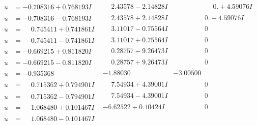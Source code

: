 \documentclass[1p]{elsarticle_modified}
\theoremstyle{definition}
\begin{document}
$$\begin{array}{c|c|c}
\begin{aligned}
u &= -0.708316 + 0.768193 I\end{aligned}
 & \phantom{-}2.43578 - 2.14828 I & \phantom{-0.000000 -}0. + 4.59076 I \\ \hline\begin{aligned}
u &= -0.708316 - 0.768193 I\end{aligned}
 & \phantom{-}2.43578 + 2.14828 I & \phantom{-0.000000 } 0. - 4.59076 I \\ \hline\begin{aligned}
u &= \phantom{-}0.745411 + 0.741861 I\end{aligned}
 & \phantom{-}3.11017 - 0.75564 I & \phantom{-0.000000 } 0 \\ \hline\begin{aligned}
u &= \phantom{-}0.745411 - 0.741861 I\end{aligned}
 & \phantom{-}3.11017 + 0.75564 I & \phantom{-0.000000 } 0 \\ \hline\begin{aligned}
u &= -0.669215 + 0.811820 I\end{aligned}
 & \phantom{-}0.28757 - 9.26473 I & \phantom{-0.000000 } 0 \\ \hline\begin{aligned}
u &= -0.669215 - 0.811820 I\end{aligned}
 & \phantom{-}0.28757 + 9.26473 I & \phantom{-0.000000 } 0 \\ \hline\begin{aligned}
u &= -0.935368\phantom{ +0.000000I}\end{aligned}
 & -1.88030\phantom{ +0.000000I} & -3.00500\phantom{ +0.000000I} \\ \hline\begin{aligned}
u &= \phantom{-}0.715362 + 0.794901 I\end{aligned}
 & \phantom{-}7.54934 + 4.39001 I & \phantom{-0.000000 } 0 \\ \hline\begin{aligned}
u &= \phantom{-}0.715362 - 0.794901 I\end{aligned}
 & \phantom{-}7.54934 - 4.39001 I & \phantom{-0.000000 } 0 \\ \hline\begin{aligned}
u &= \phantom{-}1.068480 + 0.101467 I\end{aligned}
 & -6.62522 + 0.10424 I & \phantom{-0.000000 } 0 \\ \hline\begin{aligned}
u &= \phantom{-}1.068480 - 0.101467 I\end{aligned}

\end{array}$$
\end{document}

